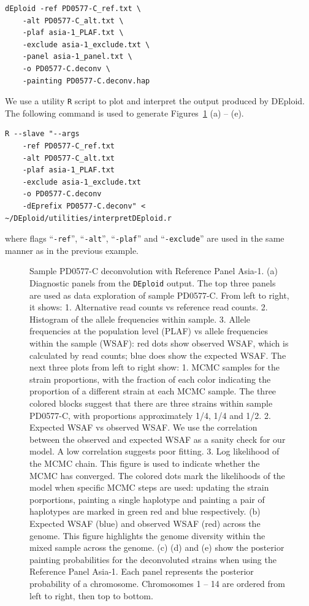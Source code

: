 \documentclass{article}
\begin{document}
\linespread{1}
\begin{lstlisting}
dEploid -ref PD0577-C_ref.txt \
    -alt PD0577-C_alt.txt \
    -plaf asia-1_PLAF.txt \
    -exclude asia-1_exclude.txt \
    -panel asia-1_panel.txt \
    -o PD0577-C.deconv \
    -painting PD0577-C.deconv.hap
\end{lstlisting}
\linespread{1.5}



We use a utility {\tt R} script to plot and interpret the output produced by DEploid. The following command is used to generate Figures~\ref{fig:PD0577} (a) -- (e).
\linespread{1}
\begin{lstlisting}
R --slave "--args
    -ref PD0577-C_ref.txt
    -alt PD0577-C_alt.txt
    -plaf asia-1_PLAF.txt
    -exclude asia-1_exclude.txt
    -o PD0577-C.deconv
    -dEprefix PD0577-C.deconv" < ~/DEploid/utilities/interpretDEploid.r
\end{lstlisting}
\linespread{1.5}
where flags ``{\tt -ref}'', ``{\tt -alt}'', ``{\tt -plaf}'' and ``{\tt -exclude}'' are used in the same manner as in the previous example.


\begin{figure}[ht]
\centering
\caption{Sample {\textmd PD0577-C} deconvolution with Reference Panel Asia-1. (a) Diagnostic panels from the \texttt{DEploid} output. The top three panels are used as data exploration of sample {\textmd PD0577-C}. From left to right, it shows: 1. Alternative read counts vs reference read counts. 2. Histogram of the allele frequencies within sample.
3. Allele frequencies at the population level (PLAF) vs allele frequencies within the sample (WSAF): red dots show observed WSAF, which is calculated by read counts; blue does show the expected WSAF. The next three plots from left to right show: 1. MCMC samples for the strain proportions, with the fraction of each color indicating the proportion of a different strain at each MCMC sample. The three colored blocks suggest that there are three strains within sample {\textmd PD0577-C}, with proportions approximately 1/4, 1/4 and 1/2.
2. Expected WSAF vs observed WSAF. We use the correlation between the observed and expected WSAF as a sanity check for our model. A low correlation suggests poor fitting.
3. Log likelihood of the MCMC chain. This figure is used to indicate whether the MCMC has converged. The colored dots mark the likelihoods of the model when specific MCMC steps are used: updating the strain porportions, painting a single haplotype and painting a pair of haplotypes are marked in green red and blue respectively. (b) Expected WSAF (blue) and observed WSAF (red) across the genome. This figure highlights the genome diversity within the mixed sample across the genome. (c) (d) and (e) show the posterior painting probabilities for the deconvoluted strains when using the Reference Panel Asia-1. Each panel represents the posterior probability of a chromosome. Chromosomes 1 -- 14 are ordered from left to right, then top to bottom.
}\label{fig:PD0577}
\end{figure}
\end{document}
